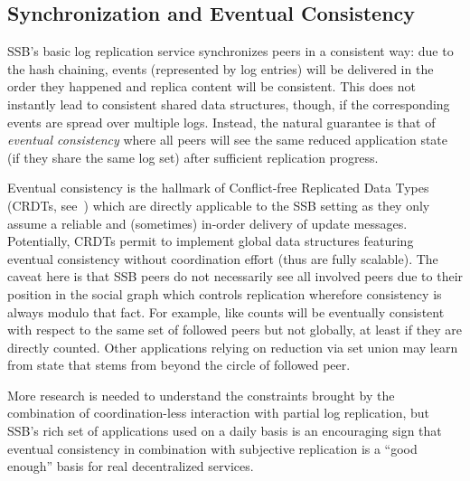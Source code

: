 \documentclass[9pt,sigconf,rewiew]{acmart}
\begin{document}

\subsection{Synchronization and Eventual Consistency}
\label{Section:Tangle}

SSB's basic log replication service synchronizes peers in a consistent
way: due to the hash chaining, events (represented by log entries)
will be delivered in the order they happened and replica content will
be consistent. This does not instantly lead to consistent shared data
structures, though, if the corresponding events are spread over
multiple logs. Instead, the natural guarantee is that of {\em eventual
  consistency} where all peers will see the same reduced application
state (if they share the same log set) after sufficient replication
progress.

Eventual consistency is the hallmark of Conflict-free Replicated Data
Types (CRDTs, see~\cite{shapiro2011conflict}) which are directly applicable to the SSB
setting as they only assume a reliable and (sometimes) in-order
delivery of update messages. Potentially, CRDTs permit to implement
global data structures featuring eventual consistency without
coordination effort (thus are fully scalable). The caveat here is that
SSB peers do not necessarily see all involved peers due to their
position in the social graph which controls replication wherefore
consistency is always modulo that fact. For example, like counts will
be eventually consistent with respect to the same set of followed
peers but not globally, at least if they are directly counted. Other
applications relying on reduction via set union may learn from state
that stems from beyond the circle of followed peer.

More research is needed to understand the constraints brought by the combination of
coordination-less interaction with partial log replication, but SSB's
rich set of applications used on a daily basis is an encouraging sign
that eventual consistency in combination with subjective replication
is a ``good enough'' basis for real decentralized services.
\end{document}
